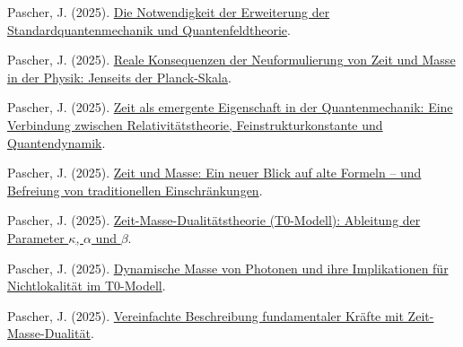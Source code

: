 \documentclass[12pt,a4paper]{article}
\begin{document}
\begin{thebibliography}{99}
		 Pascher, J. (2025). \href{https://github.com/jpascher/T0-Time-Mass-Duality/tree/main/2/pdf/Deutsch/NotwendigkeitQMErweiterung.pdf}{Die Notwendigkeit der Erweiterung der Standardquantenmechanik und Quantenfeldtheorie}.
		
		 Pascher, J. (2025). \href{https://github.com/jpascher/T0-Time-Mass-Duality/tree/main/2/pdf/Deutsch/JenseitsPlanck.pdf}{Reale Konsequenzen der Neuformulierung von Zeit und Masse in der Physik: Jenseits der Planck-Skala}.
		
		 Pascher, J. (2025). \href{https://github.com/jpascher/T0-Time-Mass-Duality/tree/main/2/pdf/Deutsch/ZeitEmergentQM.pdf}{Zeit als emergente Eigenschaft in der Quantenmechanik: Eine Verbindung zwischen Relativitätstheorie, Feinstrukturkonstante und Quantendynamik}.
		
		 Pascher, J. (2025). \href{https://github.com/jpascher/T0-Time-Mass-Duality/tree/main/2/pdf/Deutsch/ZeitMasseNeuerBlick.pdf}{Zeit und Masse: Ein neuer Blick auf alte Formeln – und Befreiung von traditionellen Einschränkungen}.
		
		 Pascher, J. (2025). \href{https://github.com/jpascher/T0-Time-Mass-Duality/tree/main/2/pdf/Deutsch/ZeitMasseT0Params.pdf}{Zeit-Masse-Dualitätstheorie (T0-Modell): Ableitung der Parameter $\kappa$, $\alpha$ und $\beta$}.
		
		 Pascher, J. (2025). \href{https://github.com/jpascher/T0-Time-Mass-Duality/tree/main/2/pdf/Deutsch/DynMassePhotonenNichtlokal.pdf}{Dynamische Masse von Photonen und ihre Implikationen für Nichtlokalität im T0-Modell}.
		
		 Pascher, J. (2025). \href{https://github.com/jpascher/T0-Time-Mass-Duality/tree/main/2/pdf/Deutsch/VierKraefteZeitMasse.pdf}{Vereinfachte Beschreibung fundamentaler Kräfte mit Zeit-Masse-Dualität}.
	\end{thebibliography}
	
\end{document}
